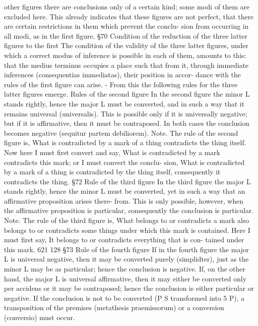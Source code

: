 other figures there are conclusions only of a certain kind; some modi of
them are excluded here. This already indicates that these figures are not
perfect, that there are certain restrictions in them which prevent the conclu-
sion from occurring in all modi, as in the first figure.
§70
Condition of the reduction of the three latter figures to the first
The condition of the validity of the three latter figures, under which a
correct modus of inference is possible in each of them, amounts to this:
that the medius terminus occupies a place such that from it, through
immediate inferences (consequentias immediatas), their position in accor-
dance with the rules of the first figure can arise. - From this the following
rules for the three latter figures emerge.
Rules of the second figure
In the second figure the minor L stands rightly, hence the major L must be
converted, and in such a way that it remains universal (universalis). This is
possible only if it is universally negative; but if it is affirmative, then it must
be contraposed. In both cases the conclusion becomes negative (sequitur
partem debiliorem).
Note.
The rule of the second figure is, What is contradicted by a mark of a thing
contradicts the thing itself. Now here I must first convert and say, What is
contradicted by a mark contradicts this mark; or I must convert the conclu-
sion, What is contradicted by a mark of a thing is contradicted by the thing
itself, consequently it contradicts the thing.
§72
Rule of the third figure
In the third figure the major L stands rightly, hence the minor L must be
converted, yet in such a way that an affirmative proposition arises there-
from. This is only possible, however, when the affirmative proposition is
particular, consequently the conclusion is particular.
Note.
The rule of the third figure is, What belongs to or contradicts a mark also
belongs to or contradicts some things under which this mark is contained.
Here I must first say, It belongs to or contradicts everything that is con-
tained under this mark.
621
128
§73
Rule of the fourth figure
If in the fourth figure the major L is universal negative, then it may be
converted purely (simplidter), just as the minor L may be as particular;
hence the conclusion is negative. If, on the other hand, the major L is
universal affirmative, then it may either be converted only per accidens or it
may be contraposed; hence the conclusion is either particular or negative.
If the conclusion is not to be converted (P S transformed into 5 P), a
transposition of the premises (metathesis praemissorum) or a conversion
(conversio) must occur.
